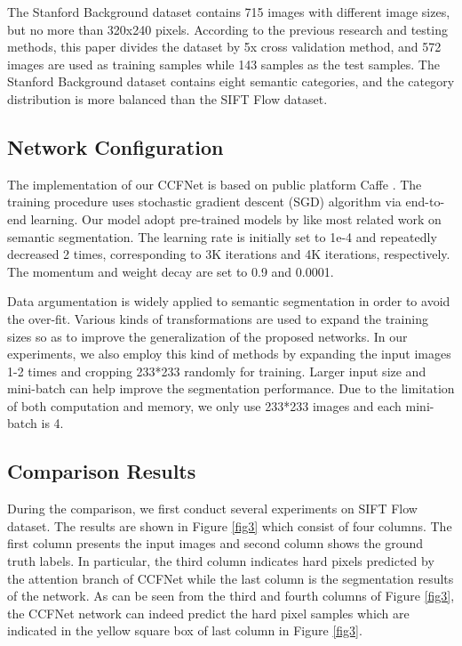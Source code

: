 \documentclass[10.5pt,compsoc]{TsT}
\newcommand{\upcite}[1]{\superscript{\textsuperscript{\cite{#1}}}}
\theoremstyle{mystyle}
\newcommand{\upcite}[1]{\textsuperscript{\cite{#1}}}
\begin{document}
{The Stanford Background dataset contains 715 images with different image sizes, but no more than 320x240 pixels. According to the previous research and testing methods, this paper divides the dataset by 5x cross validation method, and 572 images are used as training samples while 143 samples as the test samples. The Stanford Background dataset contains eight semantic categories, and the category distribution is more balanced than the SIFT Flow dataset.


\subsection{Network Configuration}
\noindent
The implementation of our CCFNet is based on public platform Caffe \upcite{24}. The training procedure uses stochastic gradient descent (SGD) algorithm via end-to-end learning. Our model adopt pre-trained models by \cite{23} like most related work on semantic segmentation. The learning rate is initially set to 1e-4 and repeatedly decreased 2 times, corresponding to 3K iterations and 4K iterations, respectively. The momentum and weight decay are set to 0.9 and 0.0001.

Data argumentation is widely applied to semantic segmentation in order to avoid the over-fit. Various kinds of transformations are used to expand the training sizes so as to improve the generalization of the proposed networks. In our experiments, we also employ this kind of methods by expanding the input images 1-2 times and cropping 233*233 randomly for training.  Larger input size and mini-batch can help improve the segmentation performance. Due to the limitation of both computation and memory, we only use 233*233 images and each mini-batch is 4.



\subsection{Comparison Results}
\noindent

During the comparison, we first conduct several experiments on SIFT Flow dataset. The results are shown in Figure \ref{fig3} which consist of four columns. The first column presents the input images and second column shows the ground truth labels. In particular, the third column indicates hard pixels predicted by the attention branch of CCFNet while the last column is the segmentation results of the network. As can be seen from the third and fourth columns of Figure \ref{fig3}, the CCFNet network can indeed predict the hard pixel samples which are indicated in the yellow square box of last column in Figure \ref{fig3}.

}
\end{document}
